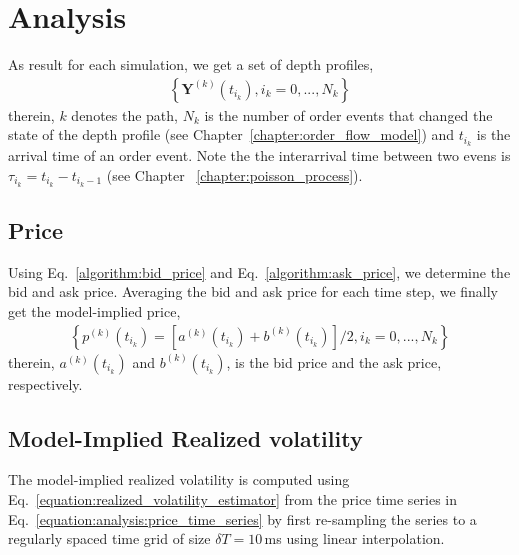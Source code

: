\documentclass[11pt, a4paper]{thesis}  %
\begin{document}
\section{Analysis}
\label{section:analysis}

As result for each simulation, we get a set of depth profiles,
%
\begin{eqnarray}
	\left\lbrace \mathbf{Y}^{(k)}(t_{i_k}), i_k = 0, ..., N_k \right\rbrace	
\end{eqnarray}
%
therein, $k$ denotes the path, $N_k$ is the number of order events that changed the state of the depth profile (see Chapter~\ref{chapter:order_flow_model}) and $t_{i_k}$ is the arrival time of an order event. Note the the interarrival time between two evens is $\tau_{i_k}=t_{i_k}-t_{i_k-1}$ (see Chapter ~\ref{chapter:poisson_process}).


\subsection{Price}
\label{section:methods:price}

Using Eq.~\ref{algorithm:bid_price} and Eq.~\ref{algorithm:ask_price}, we determine the bid and ask price. Averaging the bid and ask price for each time step, we finally get the model-implied price, 
%
\begin{eqnarray}
	\left\lbrace p^{(k)}(t_{i_k})=[a^{(k)}(t_{i_k})+b^{(k)}(t_{i_k})]/2, i_k = 0, ..., N_k\right\rbrace 
	\label{equation:analysis:price_time_series}
\end{eqnarray}
%
therein, $a^{(k)}(t_{i_k})$ and $b^{(k)}(t_{i_k})$, is the bid price and the ask price, respectively.


\subsection{Model-Implied Realized volatility}

The model-implied realized volatility is computed using Eq.~\ref{equation:realized_volatility_estimator} from the price time series in Eq.~\ref{equation:analysis:price_time_series} by first re-sampling the series to a regularly spaced time grid of size $\delta T = 10\,$ms using linear interpolation.
\end{document}
